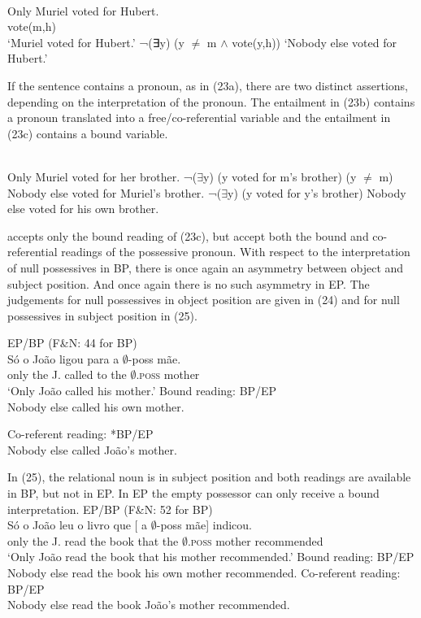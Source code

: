 \documentclass[output=paper]{langsci/langscibook}
\begin{document}
\ea%
    \citet[98–99]{Horn1969}\label{ex:wein:22}\\
    \ea 
    Only Muriel voted for Hubert.\\
    vote(m,h)\\   
    \glt ‘Muriel voted for Hubert.’
    \ex  ¬(∃y) (y ${\neq}$ m ${\wedge}$ vote(y,h))
    \glt ‘Nobody else voted for Hubert.’
    \z
\z

If the sentence contains a pronoun, as in (23a), there are two distinct assertions, depending on the interpretation of the pronoun. The entailment in (23b) contains a pronoun translated into a free\slash co-referential variable and the entailment in (23c) contains a bound variable.

\ea%
    \citet[98–99]{Horn1969}\label{ex:wein:23}\\
    \ea Only Muriel voted for her brother.
    \ex  ¬(${\exists}$y) (y voted for m’s brother) (y ${\neq}$ m)  
    \glt Nobody else voted for Muriel’s brother.
    \ex ¬(${\exists}$y) (y voted for y’s brother)
    \glt Nobody else voted for his own brother.
    \z
\z

\citet[102]{Horn1969} accepts only the bound reading of (23c), but \citet[197]{Boeckx2010} accept both the bound and co-referential readings of the possessive pronoun. With respect to the interpretation of null possessives in BP, there is once again an asymmetry between object and subject position. And once again there is no such asymmetry in EP. The judgements for null possessives in object position are given in (24) and for null possessives in subject position in (25).

\ea%
    EP\slash BP (F\&N: 44 for BP)\label{ex:wein:24}\\
    \ea 
    \gll Só o João ligou para a $\emptyset$-poss mãe.\\
         only the J. called to the $\emptyset$\textsc{.poss} mother\\
    \glt ‘Only João called his mother.’
    \ex Bound reading: BP\slash EP\\Nobody else called his own mother.
    
    \ex Co-referent reading: *BP\slash *EP\\Nobody else called João’s mother.
    \z
\z

In (25), the relational noun is in subject position and both readings are available in BP, but not in EP. In EP the empty possessor can only receive a bound interpretation.
\pagebreak
\ea%
    EP\slash BP (F\&N: 52 for BP)\label{ex:wein:25}\\
    \ea 
    \gll Só o João leu o livro que [ a $\emptyset$-poss mãe] indicou.\\
         only the J. read the book that {} the $\emptyset$\textsc{.poss} mother recommended\\
    \glt ‘Only João read the book that his mother recommended.’
    \ex Bound reading: BP\slash EP\\Nobody else read the book his own mother recommended.
    \ex Co-referent reading: BP\slash *EP\\Nobody else read the book João’s mother recommended.
    \z
\z
\end{document}
